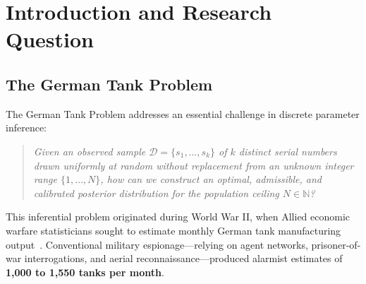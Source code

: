 \documentclass[10pt,a4paper]{article}
\begin{document}
\begin{abstract}
Finally, we apply these methods to real-world data: archival WWII German tank production records and 541,909 commercial transaction records spanning 22,061 sequential invoices. We evaluate what happens when textbook assumptions meet operational reality: chronological generation induces non-stationary arrival dynamics, operational processes (cancellations, abandoned sessions, and database sequence blocks) generate large integer voids (51.2\%), and a non-significant goodness-of-fit test cannot be interpreted as proof of uniform sampling. We resolve the resulting estimand ambiguity between address allocation capacity ($N_{\text{span}}$) and transaction count ($N_{\text{count}}$) through a Bernoulli thinning framework that clarifies why oracle rank re-indexing is not deployable in live operations, while identifying the identifiability conditions a complete operational estimator would need to satisfy. We conclude with a discussion of how this discrete inference framework connects to modern applications across dynamic industrial flow, software reliability, aviation surveillance, and mark-recapture ecology.
\end{abstract}

\section{Introduction and Research Question}

\subsection{The German Tank Problem}
The German Tank Problem addresses an essential challenge in discrete parameter inference:
\begin{quote}
\textit{Given an observed sample $\mathcal{D} = \{s_1, \dots, s_k\}$ of $k$ distinct serial numbers drawn uniformly at random without replacement from an unknown integer range $\{1, \dots, N\}$, how can we construct an optimal, admissible, and calibrated posterior distribution for the population ceiling $N \in \mathbb{N}$?}
\end{quote}

This inferential problem originated during World War II, when Allied economic warfare statisticians sought to estimate monthly German tank manufacturing output~\cite{ruggles1947,goodman1954}. Conventional military espionage---relying on agent networks, prisoner-of-war interrogations, and aerial reconnaissance---produced alarmist estimates of \textbf{1,000 to 1,550 tanks per month}. 
\end{document}
